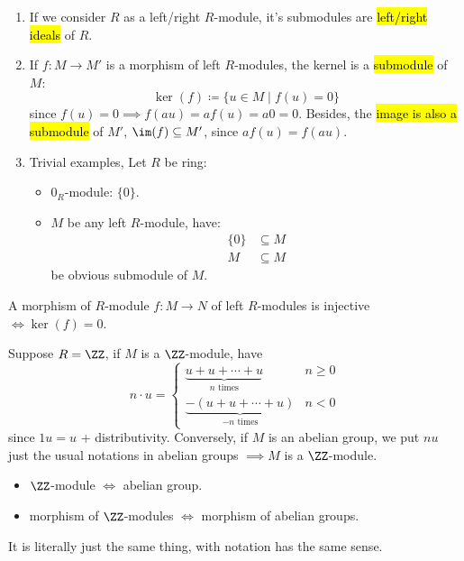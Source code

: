 \begin{eg}
	\leavevmode
	\begin{enumerate}
		\item If we consider \( R \) as a left/right \( R \)-module, it's submodules are \hl{left/right
			      ideals} of \( R \).
		\item If \( f: M \to M' \) is a morphism of left \( R \)-modules, the kernel is a \hl{submodule} of
		      \( M \):
		      \[
			      \ker(f) \coloneqq  \{u \in M \; | \; f(u) = 0\}
		      \]
		      since \( f(u)=0 \implies f(au)=af(u)=a0 = 0 \). Besides, the \hl{image is also a submodule} of
		      \( M' \), \( \im(f) \subseteq M' \), since \( af(u) = f(au) \).
		\item Trivial examples, Let \( R \) be ring:
		      \begin{itemize}
			      \item \( 0_R \)-module: \( \{0\} \).
			      \item \( M \) be any left \( R \)-module, have:
			            \[
				            \begin{aligned}
					            \{0\} & \subseteq M \\
					            M     & \subseteq M
				            \end{aligned}
			            \]
			            be obvious submodule of \( M \).
		      \end{itemize}
	\end{enumerate}
\end{eg}

\begin{remark}
	A morphism of \( R \)-module \( f: M \to N \) of left \( R \)-modules is injective \( \iff \ker(f)
	= 0\).
\end{remark}

\begin{remark}
	Suppose \( R = \ZZ \), if \( M \) is a \( \ZZ \)-module, have
	\[
		n\cdot u = \begin{cases}
			\underbrace{u + u + \cdots + u}_{n\text{ times}}     & n \ge 0 \\
			\underbrace{-(u + u + \cdots + u)}_{-n\text{ times}} & n < 0
		\end{cases}
	\]
	since \( 1u = u \) + distributivity. Conversely, if \( M \) is an abelian group, we put \( nu \)
	just the usual notations in abelian groups \( \implies M\) is a \( \ZZ \)-module.
	\begin{conclusion}
		\leavevmode
		\begin{itemize}
			\item \( \ZZ \)-module \( \iff \) abelian group.
			\item morphism of \( \ZZ \)-modules \( \iff \) morphism of abelian groups.
		\end{itemize}
		It is literally just the same thing, with notation has the same sense.
	\end{conclusion}
\end{remark}

